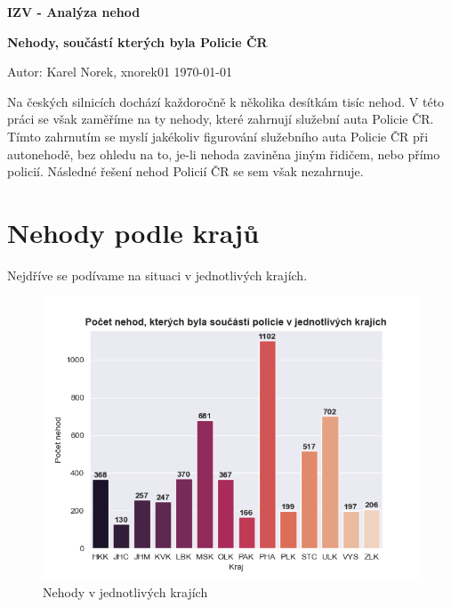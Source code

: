 \documentclass[11pt, a4paper]{article}
\begin{document}
\setcounter{page}{1}

\begin{center}
   
{\textbf{\Huge IZV - Analýza nehod}}

\vspace{0.5cm}

{\textbf{\Huge Nehody, součástí kterých byla Policie ČR}}

    
\end{center}
\begin{LARGE}

{\LARGE Autor: Karel Norek, xnorek01 \hfill \today}
\end{LARGE}

\vspace{1cm}

\LARGE
\noindent
Na českých silnicích dochází každoročně k několika desítkám tisíc nehod. V této práci se však zaměříme na ty nehody, které zahrnují služební auta Policie ČR. Tímto zahrnutím se myslí jakékoliv figurování služebního auta Policie ČR při autonehodě, bez ohledu na to, je-li nehoda zaviněna jiným řidičem, nebo přímo policií. Následné řešení nehod Policií ČR se sem však nezahrnuje.

\section{Nehody podle krajů}
Nejdříve se podívame na situaci v jednotlivých krajích.

\begin{figure}[ht]
    \centering
    \includegraphics[scale=0.8]{police.png}
    \caption{Nehody v jednotlivých krajích}
    \label{fig:graph}
\end{figure}
\end{document}
